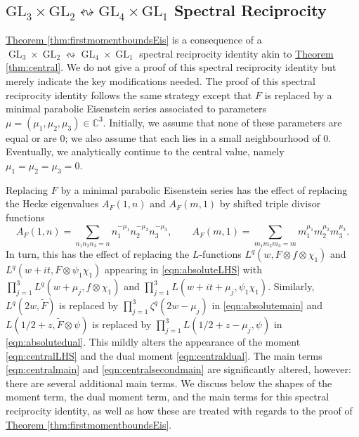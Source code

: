 \documentclass[11pt,a4paper]{amsart}
\newcommand{\C}{\mathbb{C}}
\DeclareMathOperator{\GL}{GL}
\numberwithin{equation}{section}
\theoremstyle{remark}
\theoremstyle{definition}
\begin{document}
\subsection{\texorpdfstring{$\mathrm{GL}_3 \times \mathrm{GL}_2 \leftrightsquigarrow \mathrm{GL}_4 \times \mathrm{GL}_1$}{GL\textthreeinferior \textmultiply GL\texttwoinferior \textleftrightarrow GL\textfourinferior \textmultiply GL\textoneinferior} Spectral Reciprocity}

\hyperref[thm:firstmomentboundsEis]{Theorem \ref*{thm:firstmomentboundsEis}} is a consequence of a $\GL_3 \times \GL_2 \leftrightsquigarrow \GL_4 \times \GL_1$ spectral reciprocity identity akin to \hyperref[thm:central]{Theorem \ref*{thm:central}}. We do not give a proof of this spectral reciprocity identity but merely indicate the key modifications needed. The proof of this spectral reciprocity identity follows the same strategy except that $F$ is replaced by a minimal parabolic Eisenstein series associated to parameters $\mu = (\mu_1,\mu_2,\mu_3) \in \C^3$. Initially, we assume that none of these parameters are equal or are $0$; we also assume that each lies in a small neighbourhood of $0$. Eventually, we analytically continue to the central value, namely $\mu_1 = \mu_2 = \mu_3 = 0$.

Replacing $F$ by a minimal parabolic Eisenstein series has the effect of replacing the Hecke eigenvalues $A_F(1,n)$ and $A_F(m,1)$ by shifted triple divisor functions
\[A_F(1,n) = \sum_{n_1 n_2 n_3 = n} n_1^{-\mu_1} n_2^{-\mu_2} n_3^{-\mu_3}, \qquad A_F(m,1) = \sum_{m_1 m_2 m_3 = m} m_1^{\mu_1} m_2^{\mu_2} m_3^{\mu_3}.\]
In turn, this has the effect of replacing the $L$-functions $L^q(w,F \otimes f \otimes \chi_1)$ and $L^q(w + it,F \otimes \psi_1 \chi_1)$ appearing in \eqref{eqn:absoluteLHS} with $\prod_{j = 1}^{3} L^q(w + \mu_j,f \otimes \chi_1)$ and $\prod_{j = 1}^{3} L(w + it + \mu_j,\psi_1 \chi_1)$. Similarly, $L^q(2w,\widetilde{F})$ is replaced by $\prod_{j = 1}^{3} \zeta^q(2w - \mu_j)$ in \eqref{eqn:absolutemain} and $L(1/2 + z,\widetilde{F} \otimes \psi)$ is replaced by $\prod_{j = 1}^{3} L(1/2 + z - \mu_j,\psi)$ in \eqref{eqn:absolutedual}. This mildly alters the appearance of the moment \eqref{eqn:centralLHS} and the dual moment \eqref{eqn:centraldual}. The main terms \eqref{eqn:centralmain} and \eqref{eqn:centralsecondmain} are significantly altered, however: there are several additional main terms. We discuss below the shapes of the moment term, the dual moment term, and the main terms for this spectral reciprocity identity, as well as how these are treated with regards to the proof of \hyperref[thm:firstmomentboundsEis]{Theorem \ref*{thm:firstmomentboundsEis}}.
\end{document}
